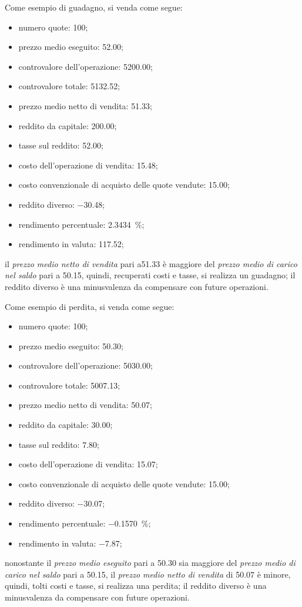 \documentclass[12pt,a4paper]{article}
\newcommand{\Eur}[1]{\SI{#1}{\text{\euro{}}}}
\begin{document}
Come esempio di guadagno, si venda come segue:
\begin{itemize}
\item numero quote: \num{100};
\item prezzo medio eseguito: \Eur{52,00};
\item controvalore dell'operazione: \Eur{5200,00};
\item controvalore totale: \Eur{5132,52};
\item prezzo medio netto di vendita: \Eur{51,33};

\item reddito da capitale: \Eur{200,00};
\item tasse sul reddito: \Eur{52,00};
\item costo dell'operazione di vendita: \Eur{15,48};
\item costo convenzionale di acquisto delle quote vendute: \Eur{15,00};
\item reddito diverso: \Eur{-30,48};

\item rendimento percentuale: \SI{2,3434}{\percent};
\item rendimento in valuta: \Eur{117,52};
\end{itemize}
il \emph{prezzo medio netto di vendita} pari a\Eur{51,33} è maggiore del \emph{prezzo
   medio di carico  nel saldo} pari a \Eur{50,15}, quindi,  recuperati costi e tasse,
si realizza  un guadagno;  il reddito  diverso è una  minusvalenza da  compensare con
future operazioni.


Come esempio di perdita, si venda come segue:
\begin{itemize}
\item numero quote: \num{100};
\item prezzo medio eseguito: \Eur{50,30};
\item controvalore dell'operazione: \Eur{5030,00};
\item controvalore totale: \Eur{5007,13};
\item prezzo medio netto di vendita: \Eur{50,07};

\item reddito da capitale: \Eur{30,00};
\item tasse sul reddito: \Eur{7,80};
\item costo dell'operazione di vendita: \Eur{15,07};
\item costo convenzionale di acquisto delle quote vendute: \Eur{15,00};
\item reddito diverso: \Eur{-30,07};

\item rendimento percentuale: \SI{-0,1570}{\percent};
\item rendimento in valuta: \Eur{-7,87};
\end{itemize}
nonostante  il \emph{prezzo  medio  eseguito}  pari a  \Eur{50,30}  sia maggiore  del
\emph{prezzo medio  di carico nel  saldo} pari  a \Eur{50,15}, il  \emph{prezzo medio
   netto  di vendita}  di  \Eur{50,07} è  minore,  quindi, tolti  costi  e tasse,  si
realizza una perdita; il reddito diverso  è una minusvalenza da compensare con future
operazioni.
\end{document}
